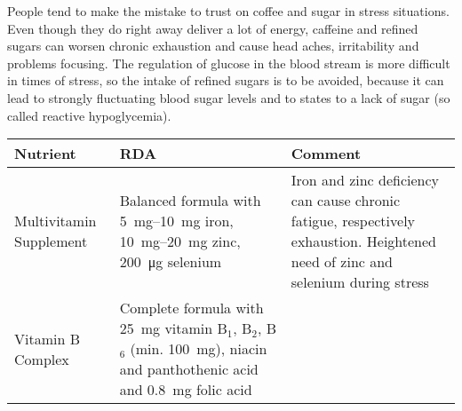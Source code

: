 \documentclass[../main.tex]{subfiles}
\begin{document}
  People tend to make the mistake to trust on coffee and sugar in stress situations.
  Even though they do right away deliver a lot of energy, caffeine and refined sugars
  can worsen chronic exhaustion
  and cause head aches, irritability
  and problems focusing.
  The regulation of glucose in the blood stream is more difficult in times of stress,
  so the intake of refined sugars is to be avoided, because it can lead to strongly fluctuating blood sugar levels
  and to states to a lack of sugar (so called reactive hypoglycemia).

  \begin{table}[htb!]
    \centering
    \begin{tabular}{p{2.2cm}p{4cm}p{5.2cm}}
      \textbf{Nutrient} &\textbf{RDA} & \textbf{Comment} \\
      \hline
      Multivitamin Supplement & Balanced formula with \SIrange{5}{10}{\milli\gram} iron\index{mineral!iron}, \SIrange{10}{20}{\milli\gram} zinc\index{mineral!zinc},
                                \SI{200}{\micro\gram} selenium\index{mineral!selenium}
                                      & Iron and zinc deficiency can cause chronic fatigue, respectively exhaustion. Heightened need of zinc and selenium during stress \\                                                                        Vitamin B Complex & Complete formula with \SI{25}{\milli\gram} vitamin B$_1$\index{vitamin!B1},  B$_2$\index{vitamin!B2},  B$_6$\index{vitamin!B6}
                                                                                                                                                                                                                                                                      (min. \SI{100}{\milli\gram}),
                                                                                                                                                                                                                                                                      niacin\index{micro nutrient!niacin} and panthothenic acid\index{micro nutrient!panthothenic acid}
                                                                                                                                                                                                                                                                      and \SI{0.8}{\milli\gram} folic acid\index{micro nutrient!folic acid}

\end{tabular}
\end{table}
\end{document}
